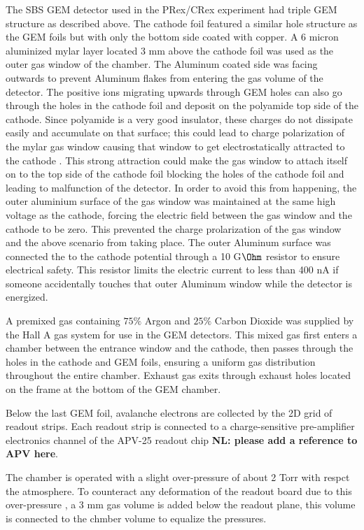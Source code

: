 The SBS GEM detector used in the PRex/CRex experiment  had  triple GEM structure as described above. The cathode foil  featured a similar hole structure as the GEM foils  but  with only the bottom side coated with copper. A 6 micron   aluminized mylar layer located 3 mm above the cathode foil was used as the outer gas window of the chamber. The Aluminum coated side was facing outwards to prevent Aluminum flakes from entering the gas volume of the detector. The positive ions migrating upwards through GEM holes can also go through the holes in the cathode foil and deposit on the polyamide top side of the cathode. Since polyamide is a very good insulator, these charges do not dissipate easily and accumulate on that surface; this could lead to  charge polarization of the mylar gas  window causing  that window to get electrostatically attracted to the cathode . This strong attraction could make the gas window to attach itself on to the top side of the cathode foil blocking the holes of the cathode foil and leading to malfunction of the detector. In order to avoid  this from happening, the outer aluminium surface of the gas window was maintained at the same high voltage as the cathode, forcing the electric field between the gas window and the cathode to be zero. This prevented the charge prolarization of the gas window and the above scenario from taking place. The outer Aluminum surface was connected the to the cathode potential through a  10 G$\Ohm$ resistor to ensure electrical safety. This resistor limits the electric current to less than 400 nA if someone accidentally touches that outer Aluminum window while the detector is energized. 

A premixed gas containing $75\%$ Argon and $25\%$ Carbon Dioxide was  supplied by the Hall A gas system for use in the GEM detectors. This mixed gas first enters a  chamber between the entrance window and the cathode, then passes through the holes in the cathode and GEM foils, ensuring a uniform gas distribution  throughout the entire chamber. Exhaust gas exits through exhaust holes located on the frame at the bottom of the GEM chamber.

Below the last  GEM foil, avalanche electrons are collected by the 2D grid of  readout strips. Each readout strip is connected to a charge-sensitive pre-amplifier electronics channel of the APV-25 readout chip {\bf NL: please add a reference to APV here}. 

The chamber is operated with a slight over-pressure of about 2 Torr with respct the atmosphere.  To counteract any deformation  of the readout board due to this  over-pressure , a 3 mm gas volume is added below the readout plane, this volume is connected to the chmber volume to equalize  the pressures. 


